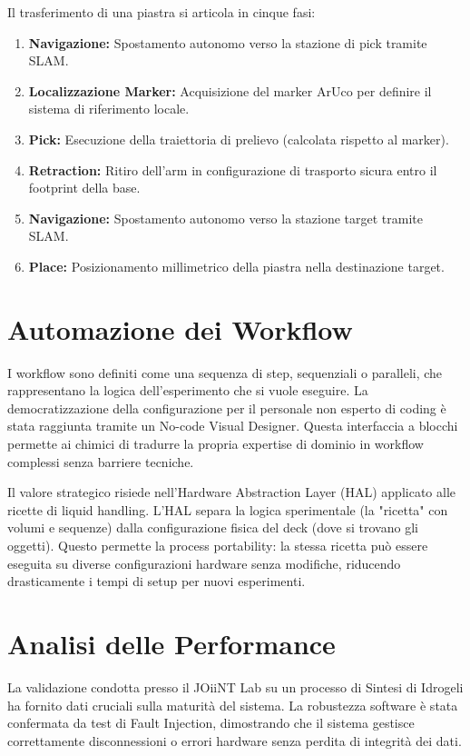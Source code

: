 \documentclass[11pt,a4paper]{article}
\begin{document}
	Il trasferimento di una piastra si articola in cinque fasi:
	\begin{enumerate}
		\item \textbf{Navigazione:} Spostamento autonomo verso la stazione di pick tramite SLAM.
		\item \textbf{Localizzazione Marker:} Acquisizione del marker ArUco per definire il sistema di riferimento locale.
		\item \textbf{Pick:} Esecuzione della traiettoria di prelievo (calcolata rispetto al marker).
		\item \textbf{Retraction:} Ritiro dell'arm in configurazione di trasporto sicura entro il footprint della base.
		\item \textbf{Navigazione:} Spostamento autonomo verso la stazione target tramite SLAM.
		\item \textbf{Place:} Posizionamento millimetrico della piastra nella destinazione target.
	\end{enumerate}
 
	
	\section{Automazione dei Workflow}	
	I workflow sono definiti come una sequenza di step, sequenziali o paralleli, che rappresentano la logica dell'esperimento che si vuole eseguire.	
	La democratizzazione della configurazione per il personale non esperto di coding è stata raggiunta tramite un No-code Visual Designer. Questa interfaccia a blocchi permette ai chimici di tradurre la propria expertise di dominio in workflow complessi senza barriere tecniche.
	
	Il valore strategico risiede nell'Hardware Abstraction Layer (HAL) applicato alle ricette di liquid handling. L'HAL separa la logica sperimentale (la "ricetta" con volumi e sequenze) dalla configurazione fisica del deck (dove si trovano gli oggetti). Questo permette la process portability: la stessa ricetta può essere eseguita su diverse configurazioni hardware senza modifiche, riducendo drasticamente i tempi di setup per nuovi esperimenti.
	
	
	\section{Analisi delle Performance}
	La validazione condotta presso il JOiiNT Lab su un processo di Sintesi di Idrogeli ha fornito dati cruciali sulla maturità del sistema. La robustezza software è stata confermata da test di Fault Injection, dimostrando che il sistema gestisce correttamente disconnessioni o errori hardware senza perdita di integrità dei dati.
	
\end{document}
